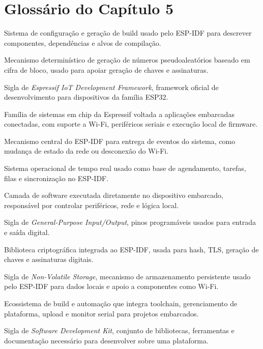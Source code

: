 \chapter*{Glossário do Capítulo 5}

\begin{description}[
  font=\normalfont\bfseries,
  style=multiline,
  leftmargin=5.8cm,
  labelwidth=5.1cm,
  labelsep=0.35cm,
  itemsep=0.55\baselineskip
]
  \item[CMake] Sistema de configuração e geração de build usado pelo ESP-IDF para descrever componentes, dependências e alvos de compilação.
  \item[CTR\_DRBG] Mecanismo determinístico de geração de números pseudoaleatórios baseado em cifra de bloco, usado para apoiar geração de chaves e assinaturas.
  \item[ESP-IDF] Sigla de \textit{Espressif IoT Development Framework}, framework oficial de desenvolvimento para dispositivos da família ESP32.
  \item[ESP32] Família de sistemas em chip da Espressif voltada a aplicações embarcadas conectadas, com suporte a Wi-Fi, periféricos seriais e execução local de firmware.
  \item[Event Loop] Mecanismo central do ESP-IDF para entrega de eventos do sistema, como mudança de estado da rede ou desconexão do Wi-Fi.
  \item[FreeRTOS] Sistema operacional de tempo real usado como base de agendamento, tarefas, filas e sincronização no ESP-IDF.
  \item[Firmware] Camada de software executada diretamente no dispositivo embarcado, responsável por controlar periféricos, rede e lógica local.
  \item[GPIO] Sigla de \textit{General-Purpose Input/Output}, pinos programáveis usados para entrada e saída digital.
  \item[Mbed TLS] Biblioteca criptográfica integrada ao ESP-IDF, usada para hash, TLS, geração de chaves e assinaturas digitais.
  \item[NVS] Sigla de \textit{Non-Volatile Storage}, mecanismo de armazenamento persistente usado pelo ESP-IDF para dados locais e apoio a componentes como Wi-Fi.
  \item[PlatformIO] Ecossistema de build e automação que integra toolchain, gerenciamento de plataforma, upload e monitor serial para projetos embarcados.
  \item[SDK] Sigla de \textit{Software Development Kit}, conjunto de bibliotecas, ferramentas e documentação necessário para desenvolver sobre uma plataforma.

\end{description}
